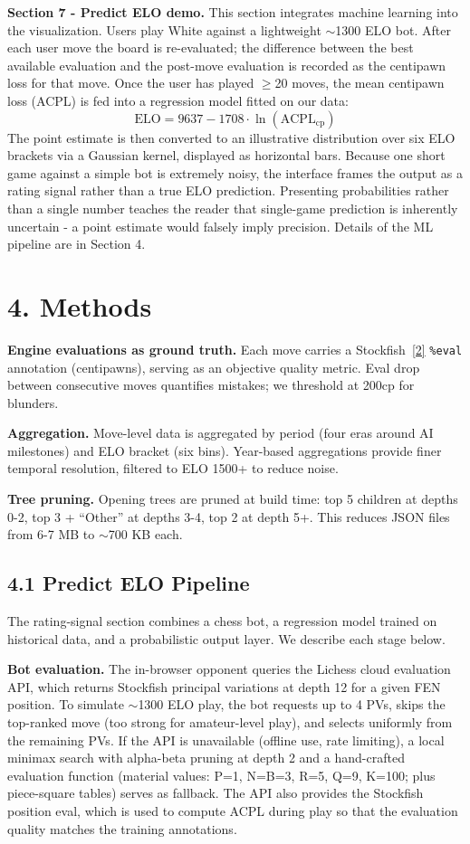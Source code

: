 \documentclass[a4paper]{article}
\begin{document}
\textbf{Section 7 - Predict ELO demo.}
This section integrates machine learning into the visualization. Users play White against a lightweight $\sim$1300 ELO bot. After each user move the board is re-evaluated; the difference between the best available evaluation and the post-move evaluation is recorded as the centipawn loss for that move. Once the user has played $\geq$20 moves, the mean centipawn loss (ACPL) is fed into a regression model fitted on our data:
\[
  \text{ELO} = 9637 - 1708 \cdot \ln(\text{ACPL}_{\text{cp}})
\]
The point estimate is then converted to an illustrative distribution over six ELO brackets via a Gaussian kernel, displayed as horizontal bars. Because one short game against a simple bot is extremely noisy, the interface frames the output as a rating signal rather than a true ELO prediction. Presenting probabilities rather than a single number teaches the reader that single-game prediction is inherently uncertain - a point estimate would falsely imply precision. Details of the ML pipeline are in Section 4.


\section*{4. Methods}

\textbf{Engine evaluations as ground truth.}
Each move carries a Stockfish~\hyperlink{ref2}{[2]} \texttt{\%eval} annotation (centipawns), serving as an objective quality metric. Eval drop between consecutive moves quantifies mistakes; we threshold at 200cp for blunders.

\textbf{Aggregation.}
Move-level data is aggregated by period (four eras around AI milestones) and ELO bracket (six bins). Year-based aggregations provide finer temporal resolution, filtered to ELO 1500+ to reduce noise.

\textbf{Tree pruning.}
Opening trees are pruned at build time: top 5 children at depths 0-2, top 3 + ``Other'' at depths 3-4, top 2 at depth 5+. This reduces JSON files from 6-7 MB to $\sim$700 KB each.


\subsection*{4.1 Predict ELO Pipeline}

The rating-signal section combines a chess bot, a regression model trained on historical data, and a probabilistic output layer. We describe each stage below.

\textbf{Bot evaluation.}
The in-browser opponent queries the Lichess cloud evaluation API, which returns Stockfish principal variations at depth 12 for a given FEN position. To simulate $\sim$1300 ELO play, the bot requests up to 4 PVs, skips the top-ranked move (too strong for amateur-level play), and selects uniformly from the remaining PVs. If the API is unavailable (offline use, rate limiting), a local minimax search with alpha-beta pruning at depth 2 and a hand-crafted evaluation function (material values: P=1, N=B=3, R=5, Q=9, K=100; plus piece-square tables) serves as fallback. The API also provides the Stockfish position eval, which is used to compute ACPL during play so that the evaluation quality matches the training annotations.
\end{document}
